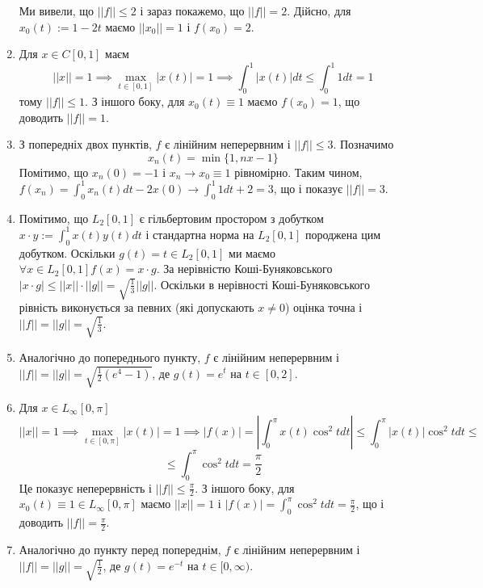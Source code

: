 \documentclass[12pt]{article} %
\newcommand{\mynorm}[1]{\left|\left|#1\right|\right|}
\newcommand{\myabs}[1]{\left|#1\right|}
\let\oldmin\min
\renewcommand{\min}{\displaystyle\oldmin}
\let\oldmax\max
\renewcommand{\max}{\displaystyle\oldmax}
\begin{document}
\begin{enumerate}
{			Ми вивели, що $\mynorm{f}\leq 2$ і зараз покажемо, що $\mynorm{f}=2$. Дійсно, для $x_0(t):=1-2t$ маємо
			$\mynorm{x_0}=1$ і $f(x_0)=2$.
			}
		\item{Для $x\in C[0,1]$ маєм
			\[\mynorm{x}=1\implies \max_{t\in[0,1]}\myabs{x(t)}=1\implies\int_0^1\myabs{x(t)}dt\leq \int_0^1 1dt=1\]
			тому $\mynorm{f}\leq 1$. З іншого боку, для $x_0(t)\equiv 1$ маємо $f(x_0)=1$, що доводить $\mynorm{f}=1$.
			}
		\item{З попередніх двох пунктів, $f$ є лінійним неперервним і $\mynorm{f}\leq 3$. Позначимо
			\[x_n(t)=\min\{1,nx-1\}\]
			Помітимо, що $x_n(0)=-1$ і $x_n\to x_0\equiv 1$ рівномірно. Таким чином,
			$f(x_n)=\int_0^1 x_n(t)dt-2x(0)\to\int_0^1 1dt +2=3$, що і показує $\mynorm{f}=3$.
			}
		\item{Помітимо, що $L_2[0,1]$ є гільбертовим простором з добутком $x\cdot y:=\int_0^1 x(t)y(t)dt$ і стандартна норма
			на $L_2[0,1]$ породжена цим добутком. Оскільки $g(t)=t\in L_2[0,1]$ ми маємо $\forall x\in L_2[0,1]
			f(x)=x\cdot g$. За нерівністю Коші-Буняковського $\myabs{x\cdot g}\leq \mynorm{x}\cdot\mynorm{g}=\sqrt{\frac{1}{3}}\mynorm{g}
			$. Оскільки в нерівності Коші-Буняковського рівність виконується за певних (які допускають $x\neq 0$) оцінка точна
			і $\mynorm{f}=\mynorm{g}=\sqrt{\frac{1}{3}}$.
			}
		\item{Аналогічно до попереднього пункту, $f$ є лінійним неперервним і $\mynorm{f}=\mynorm{g}=\sqrt{\frac{1}{2}
			(e^4-1)}$, де $g(t)=e^t$
			на $t\in[0,2]$.
			}
		\item{Для $x\in L_\infty [0,\pi]$
			\[\mynorm{x}=1\implies\max_{t\in[0,\pi]}\myabs{x(t)}=1\implies\myabs{f(x)}=\myabs{\int_0^\pi x(t)\cos^2tdt}\leq
			\int_0^\pi\myabs{x(t)}\cos^2tdt\leq\]
			\[\leq \int_0^\pi \cos^2tdt=\frac{\pi}{2}
			\]
			Це показує неперервність і $\mynorm{f}\leq\frac{\pi}{2}$. З іншого боку, для $x_0(t)\equiv 1\in L_\infty[0,\pi]$
			маємо $\mynorm{x}=1$ і $\myabs{f(x)}=\int_0^\pi \cos^2tdt=\frac{\pi}{2}$, що і доводить $\mynorm{f}=\frac{\pi}{2}$.
			}
		\item{Аналогічно до пункту перед попереднім, $f$ є лінійним неперервним
			і $\mynorm{f}=\mynorm{g}=\sqrt{\frac{1}{2}}$, де $g(t)=e^{-t}$
			на $t\in[0,\infty)$.
			}
	\end{enumerate}
\end{document}
